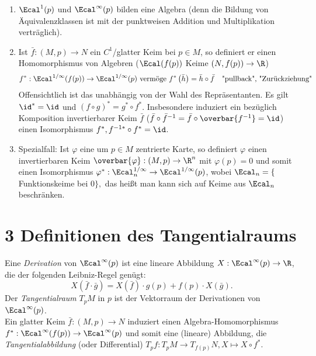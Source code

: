 \begin{rem}
	\begin{enumerate}[label={\roman*})]
		\item $\Ecal^1(p)$ und $\Ecal^\infty(p)$ bilden eine Algebra (denn die Bildung von Äquivalenzklassen ist mit der punktweisen Addition und Multiplikation verträglich).
		\item Ist $ \bar{f}: (M,p)\to N $ ein $C^1$/glatter Keim bei $p \in M$, so definiert er einen Homomorphismus von Algebren \big($\Ecal(f(p))$ Keime $(N,f(p)) \to \R$\big)
		\[ f^*: \Ecal^{1/\infty} (f(p)) \to \Ecal^{1/\infty} (p) \ \text{vermöge } f^* \left( \bar{h} \right) = \bar{h} \circ \bar{f} \quad \text{"pullback", "Zurückziehung"} \]
		Offensichtlich ist das unabhängig von der Wahl des Repräsentanten.
		Es gilt $\id^* = \id$ und $(f \circ g)^* = g^* \circ f^*$. Insbesondere induziert ein bezüglich Komposition invertierbarer Keim $\bar{f}$ ($ \bar{f} \circ \bar{f}^{-1} = \bar{f} \circ \overbar{f^{-1}} = \id $) einen Isomorphismus $f^*, f^{-1 *} \circ f^* = \id$.
		\item Spezialfall: Ist $\varphi$ eine um $p \in M$ zentrierte Karte, so definiert $\varphi$ einen invertierbaren Keim $ \overbar{\varphi}: (M,p) \to \R^n $ mit $\varphi(p)=0$ und somit einen Isomorphismus $ \varphi^*: \Ecal^{1/\infty}_n \to \Ecal^{1/\infty} (p) $, wobei $ \Ecal_n = \{$Funktionskeime bei $0 \}, $ das heißt man kann sich auf Keime aus $\Ecal_n$ beschränken.
	\end{enumerate}
\end{rem}

\section{3 Definitionen des Tangentialraums}

\begin{defn}
	Eine \emph{Derivation} von $\Ecal^\infty(p)$ ist eine lineare Abbildung $X: \Ecal^\infty(p) \to \R$, die der folgenden Leibniz-Regel genügt:
	\[ X(\bar{f} \cdot \bar{g}) = X(\bar{f}) \cdot g(p) + f(p) \cdot X(\bar{g}). \]
	Der \emph{Tangentialraum} $T_pM$ in $p$ ist der Vektorraum der Derivationen von $\Ecal^\infty(p)$.\\
	Ein glatter Keim $ \bar{f}: (M,p) \to N $ induziert einen Algebra-Homomorphismus $ f^*: \Ecal^\infty (f(p)) \to \Ecal^\infty (p) $ und somit eine (lineare) Abbildung, die \emph{Tangentialabbildung} (oder Differential) $ T_pf: T_pM \to T_{f(p)}N, X \mapsto X \circ f^*. $
\end{defn}

